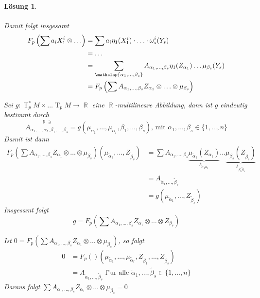 \documentclass[paper=A4, twoside, chapterprefix=true, bibliography=totoc, headsepline]{scrbook}
\DeclareMathOperator{\R}{\mathbb{R}}
\DeclareMathOperator{\T}{T}         %
\newcommand{\X}{\times}
\theoremstyle{plain}
\theoremstyle{nonumberplain}
\theoremstyle{empty}
\theoremstyle{break}
\newtheorem{Loes}{L\"osung}
\begin{document}
\begin{Loes}
\begin{description}[leftmargin=*]
\begin{itemize}[leftmargin=*]
\begin{align*}
			\end{align*}
			Damit folgt insgesamt
			\begin{align*}
				F_p\left(\sum a_i X_1^{i} \otimes \ldots \right) &= \sum a_i \eta_1 (X_1^{i}) \cdot \ldots \cdot \omega_s^{i} (Y_s) \\
					& = \ldots \\
					& = \sum_{\mathclap{\alpha_1,\ldots ,\beta_s}} A_{\alpha_1,\ldots ,\beta_s} \eta_1(Z_{\alpha_1}) \ldots \mu_{\beta_s}(Y_s)\\
					& = F_p \left(\sum A_{\alpha_1,\ldots ,\beta_s} Z_{\alpha_1} \otimes \ldots \otimes \mu_{\beta_s}\right)
			\end{align*}
	\end{itemize}
\item[$\bm{F_p}$ ist $\R$-linear]
\item[$\bm{F_p}$ ist surjektiv:]
	Sei $g: \T_p^*M \X \ldots \T_pM \to \R$ eine $\R$-multilineare Abbildung, dann ist $g$ eindeutig bestimmt durch
		\[ \overset{\R \ni}{A_{\alpha_1, \ldots , \alpha_r, \beta_1, \ldots , \beta_s}} = g(\mu_{\alpha_1}, \ldots , \mu_{\alpha_r}, \beta_1, \ldots , \beta_s) \text{, mit } \alpha_1, \ldots , \beta_s \in \{1,\ldots ,n\} \]
	Damit ist dann
	\begin{align*}
		F_p\left(\sum A_{\alpha_1,\ldots ,\beta_s} Z_{\alpha_1} \otimes \ldots \otimes \mu_{\beta_s}\right) (\mu_{\tilde\alpha_1},\ldots ,Z_{\tilde\beta_s}) &= \sum A_{\alpha_1,\ldots ,\beta_s} \underbrace{\mu_{\tilde \alpha_1}(Z_{\alpha_1})}_{\delta_{\tilde \alpha_1 \alpha_1}} \ldots \underbrace{\mu_{\beta_s} (Z_{\tilde \beta_s})}_{\delta_{\beta_s\tilde\beta_s}}\\
		&= A_{\tilde\alpha_1,\ldots ,\tilde\beta_s}\\
		&= g(\mu_{\tilde\alpha_1},\ldots ,Z_{\tilde\beta_s})
	\end{align*}
	Insgesamt folgt
		\[ g = F_p\left(\sum A_{\alpha_1,\ldots ,\beta_s} Z_{\alpha_1} \otimes \ldots  \otimes Z_{\beta_s}\right) \]
\item[$\bm{F_p}$ ist injektiv:]
	Ist $0 = F_p(\sum A_{\alpha_1,\ldots ,\beta_s} Z_{\alpha_1} \otimes \ldots \otimes \mu_{\beta_s})$, so folgt
	\begin{align*}
		0 &= F_p() (\mu_{\tilde\alpha_1},\ldots ,\mu_{\tilde\alpha_r}, Z_{\tilde\beta_1}, \ldots , Z_{\tilde\beta_s})\\
		&= A_{\tilde\alpha_1,\ldots ,\tilde\beta_s} \text{ f"ur alle } \tilde\alpha_1, \ldots , \tilde\beta_s \in \{1,\ldots ,n\}
	\end{align*}
	Daraus folgt $\sum A_{\alpha_1,\ldots ,\beta_s} Z_{\alpha_1} \otimes \ldots \otimes \mu_{\beta_s} = 0$

\end{description}
\end{Loes}
\end{document}
